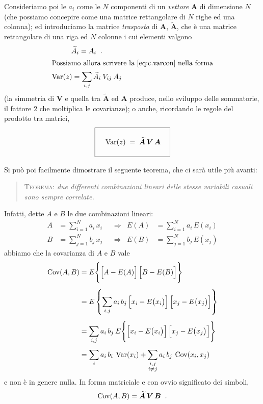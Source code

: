 Consideriamo poi le $a_i$ come le $N$ componenti di un
\emph{vettore} $\boldsymbol{A}$ di dimensione $N$ (che
possiamo concepire come una matrice rettangolare di $N$
righe ed una colonna); ed introduciamo la matrice
\emph{trasposta} di $\boldsymbol{A}$,
$\boldsymbol{\widetilde A}$, che \`e una matrice
rettangolare di una riga ed $N$ colonne i cui elementi
valgono
\begin{gather*}
  \widetilde A_i = A_i \;\; . \\
  \intertext{Possiamo allora scrivere la
    \eqref{eq:c.varcon} nella forma}
  \operatorname{Var}(z) = \sum_{i,j} \widetilde A_i \: V_{ij}
    \: A_j
\end{gather*}
(la simmetria di $\boldsymbol{V}$ e quella tra
$\boldsymbol{\widetilde A}$ ed $\boldsymbol{A}$ produce,
nello sviluppo delle sommatorie, il fattore 2 che moltiplica
le covarianze); o anche, ricordando le regole del prodotto
tra matrici,
\begin{equation*}
  \boxed{ \rule[-5mm]{0mm}{12mm} \quad
    \var(z) \; = \; \boldsymbol{\widetilde A} \,
      \boldsymbol{V} \, \boldsymbol{A}
    \quad}
\end{equation*}%
%

Si pu\`o poi facilmente dimostrare il seguente teorema, che
ci sar\`a utile pi\`u avanti:
\begin{quote}
  \textsc{Teorema:} \textit{due differenti combinazioni
    lineari delle stesse variabili casuali sono sempre
    correlate.  }
\end{quote}
Infatti, dette $A$ e $B$ le due combinazioni lineari:
\begin{align*}
  A &= \sum_{i=1}^N a_i \, x_i &&\text{$\Rightarrow$}
    & E(A) &= \sum_{i=1}^N a_i \, E(x_i) \\[1ex]
  B &= \sum_{j=1}^N b_j \, x_j &&\text{$\Rightarrow$}
    & E(B) &= \sum_{j=1}^N b_j \, E(x_j)
\end{align*}
abbiamo che la covarianza di $A$ e $B$ vale
\begin{align*}
  \operatorname{Cov}(A, B) &= E \Biggl\{ \Bigl[ A - E(A) \Bigr] \,
    \Bigl[ B - E(B) \Bigr] \Biggr\} \\[1ex]
  &= E \left\{ \sum_{i,j} a_i \, b_j \, \Bigl[ x_i - E
    \bigl( x_i \bigr) \Bigr] \, \Bigl[ x_j - E \bigl(
    x_j \bigr) \Bigr] \right\} \\[1ex]
  &= \sum_{i,j} a_i \, b_j \: E \Biggl\{ \Bigl[ x_i - E
    \bigl( x_i \bigr) \Bigr] \, \Bigl[ x_j - E \bigl(
    x_j \bigr) \Bigr] \Biggr\} \\[1ex]
  &= \sum_i a_i \, b_i \: \operatorname{Var}(x_i) +
    \sum_{\substack{i,j\\i\ne j}} a_i \, b_j \:
    \operatorname{Cov}(x_i, x_j)
\end{align*}
e non \`e in genere nulla.  In forma matriciale e con ovvio
significato dei simboli,
\begin{equation*}
  \operatorname{Cov}(A, B) = \boldsymbol{\widetilde A} \,
    \boldsymbol{V} \, \boldsymbol{B} \;\; .
\end{equation*}

